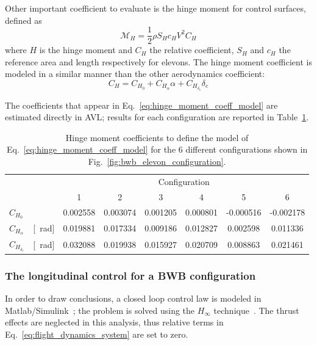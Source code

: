 Other important coefficient to evaluate is the hinge moment for control surfaces, defined as
\begin{equation}
	\label{eq:hinge_moment_def}
	\mathcal{M}_H = \frac{1}{2}\rho S_H c_H V^2 C_H
\end{equation}
where $H$ is the hinge moment and $C_H$ the relative coefficient, $S_H$ and $c_H$ the reference area and length respectively for elevons. 
The hinge moment coefficient is modeled in a similar manner than the other aerodynamics coefficient: 
\begin{equation}
	\label{eq:hinge_moment_coeff_model}
	C_H = C_{H_{0}} + C_{H_{\alpha}}\alpha + C_{H_{\delta_{e}}}\delta_{e}
\end{equation}

The coefficients that appear in Eq.~\eqref{eq:hinge_moment_coeff_model} are estimated directly in AVL; results for each configuration are reported in Table~\ref{tab:hinge_coeff_elevon_conf}.
\begin{table}
	\centering
	\begin{tabular}{l l c c c c c c}
		\cline{3-8}
		& & \multicolumn{6}{c}{Configuration} \\
		& & 1 & 2 & 3 & 4 & 5 & 6 \\
		\hline
		$C_{H_{0}}$ & & 0.002558 & 0.003074 & 0.001205 & 0.000801 & -0.000516 & -0.002178 \\
		$C_{H_{\alpha}}$ & [\si{\per\radian}] & 0.019881 & 0.017334 & 0.009186 & 0.012827 & 0.002598 & 0.011336 \\
		$C_{H_{\delta_{e}}}$ & [\si{\per\radian}] & 0.032088 & 0.019938 & 0.015927 & 0.020709 & 0.008863 & 0.021461 \\
		\hline
	\end{tabular}
	\caption{Hinge moment coefficients to define the model of Eq.~\eqref{eq:hinge_moment_coeff_model} for the 6 different configurations shown in Fig.~\ref{fig:bwb_elevon_configuration}.}
	\label{tab:hinge_coeff_elevon_conf}
\end{table}

\subsubsection{The longitudinal control for a BWB configuration}
\label{subsubsec:chap4_bwb_longitudinal_control_results}

In order to draw conclusions, a closed loop control law is modeled in Matlab/Simulink~\cite{bib:simulink}; the problem is solved using the $H_{\infty}$ technique~\cite{bib:apkarian}.
The thrust effects are neglected in this analysis, thus relative terms in Eq.~\eqref{eq:flight_dynamics_system} are set to zero. 

